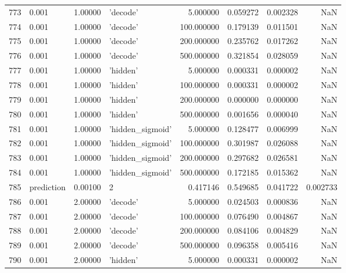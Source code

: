 \documentclass[10pt,a4paper]{article}
\begin{document}
\begin{tabular}{llrlrrrr}
773  &       0.001 &   1.00000 &           'decode' &    5.000000 &  0.059272 &  0.002328 &       NaN \\
774  &       0.001 &   1.00000 &           'decode' &  100.000000 &  0.179139 &  0.011501 &       NaN \\
775  &       0.001 &   1.00000 &           'decode' &  200.000000 &  0.235762 &  0.017262 &       NaN \\
776  &       0.001 &   1.00000 &           'decode' &  500.000000 &  0.321854 &  0.028059 &       NaN \\
777  &       0.001 &   1.00000 &           'hidden' &    5.000000 &  0.000331 &  0.000002 &       NaN \\
778  &       0.001 &   1.00000 &           'hidden' &  100.000000 &  0.000331 &  0.000002 &       NaN \\
779  &       0.001 &   1.00000 &           'hidden' &  200.000000 &  0.000000 &  0.000000 &       NaN \\
780  &       0.001 &   1.00000 &           'hidden' &  500.000000 &  0.001656 &  0.000040 &       NaN \\
781  &       0.001 &   1.00000 &   'hidden\_sigmoid' &    5.000000 &  0.128477 &  0.006999 &       NaN \\
782  &       0.001 &   1.00000 &   'hidden\_sigmoid' &  100.000000 &  0.301987 &  0.026088 &       NaN \\
783  &       0.001 &   1.00000 &   'hidden\_sigmoid' &  200.000000 &  0.297682 &  0.026581 &       NaN \\
784  &       0.001 &   1.00000 &   'hidden\_sigmoid' &  500.000000 &  0.172185 &  0.015362 &       NaN \\
785  &  prediction &   0.00100 &                  2 &    0.417146 &  0.549685 &  0.041722 &  0.002733 \\
786  &       0.001 &   2.00000 &           'decode' &    5.000000 &  0.024503 &  0.000836 &       NaN \\
787  &       0.001 &   2.00000 &           'decode' &  100.000000 &  0.076490 &  0.004867 &       NaN \\
788  &       0.001 &   2.00000 &           'decode' &  200.000000 &  0.084106 &  0.004829 &       NaN \\
789  &       0.001 &   2.00000 &           'decode' &  500.000000 &  0.096358 &  0.005416 &       NaN \\
790  &       0.001 &   2.00000 &           'hidden' &    5.000000 &  0.000331 &  0.000002 &       NaN \\

\end{tabular}
\end{document}
